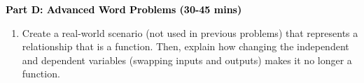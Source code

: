 \documentclass[12pt, letterpaper, fleqn]{article}
\begin{document}
\newpage

\begin{tcolorbox}[colback=customteal!20]
\large\textcolor{black}{\textbf{Part D: Advanced Word Problems (30-45 mins)}}
\end{tcolorbox}

\vspace{3mm}

\begin{enumerate}[itemsep=5.5cm, leftmargin=0.6cm, resume]
\item Create a real-world scenario (not used in previous problems) that represents a relationship that is a function. Then, explain how changing the independent and dependent variables (swapping inputs and outputs) makes it no longer a function.
\end{enumerate}
\end{document}
